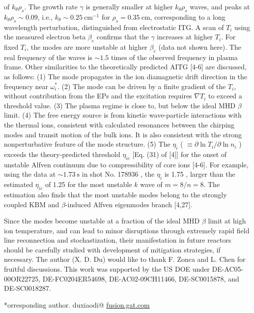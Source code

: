 \documentclass[10pt]{article}
\begin{document}
of $k_{\theta} \rho_{s}$. The growth rate $\gamma$ is generally smaller at higher $k_{\theta} \rho_{s}$ waves, and peaks at $k_{\theta} \rho_{s} \sim 0.09$, i.e., $k_{\theta} \sim 0.25 \mathrm{~cm}^{-1}$ for $\rho_{s}=0.35 \mathrm{~cm}$, corresponding to a long wavelength perturbation, distinguished from electrostatic ITG. A scan of $T_{i}$ using the measured electron beta $\beta_{e}$ confirms that the $\gamma$ increases at higher $T_{i}$. For fixed $T_{i}$, the modes are more unstable at higher $\beta_{e}$ (data not shown here). The real frequency of the waves is $\sim 1.5$ times of the observed frequency in plasma frame. Other similarities to the theoretically predicted AITG [4-6] are discussed, as follows: (1) The mode propagates in the ion diamagnetic drift direction in the frequency near $\omega_{i}^{*}$. (2) The mode can be driven by a finite gradient of the $T_{i}$, without contribution from the EPs and the excitation requires $\nabla T_{i}$ to exceed a threshold value. (3) The plasma regime is close to, but below the ideal MHD $\beta$ limit. (4) The free energy source is from kinetic wave-particle interactions with the thermal ions, consistent with calculated resonances between the chirping modes and transit motion of the bulk ions. It is also consistent with the strong nonperturbative feature of the mode structure. (5) The $\eta_{i}$ ( $\equiv \partial \ln T_{i} / \partial \ln n_{i}$ ) exceeds the theory-predicted threshold $\eta_{i c}$ [Eq. (31) of [4]] for the onset of unstable Alfven continuum due to compressibility of core ions [4-6]. For example, using the data at $\sim 1.73 \mathrm{~s}$ in shot No. 178936 , the $\eta_{i}$ is 1.75 , larger than the estimated $\eta_{i c}$ of 1.25 for the most unstable $k$ wave of $m=8 / n=8$. The estimation also finds that the most unstable modes belong to the strongly coupled $\mathrm{KBM}$ and $\beta$-induced Alfven eigenmodes branch [4,27].

Since the modes become unstable at a fraction of the ideal MHD $\beta$ limit at high ion temperature, and can lead to minor disruptions through extremely rapid field line reconnection and stochastization, their manifestation in future reactors should be carefully studied with development of mitigation strategies, if necessary. The author (X. D. Du) would like to thank F. Zonca and L. Chen for fruitful discussions. This work was supported by the US DOE under DE-AC05-00OR22725, DE-FC0204ER54698, DE-AC02-09CH11466, DE-SC0015878, and DE-SC0018287.

*orresponding author. duxiaodi@ \href{http://fusion.gat.com}{fusion.gat.com}
\end{document}
